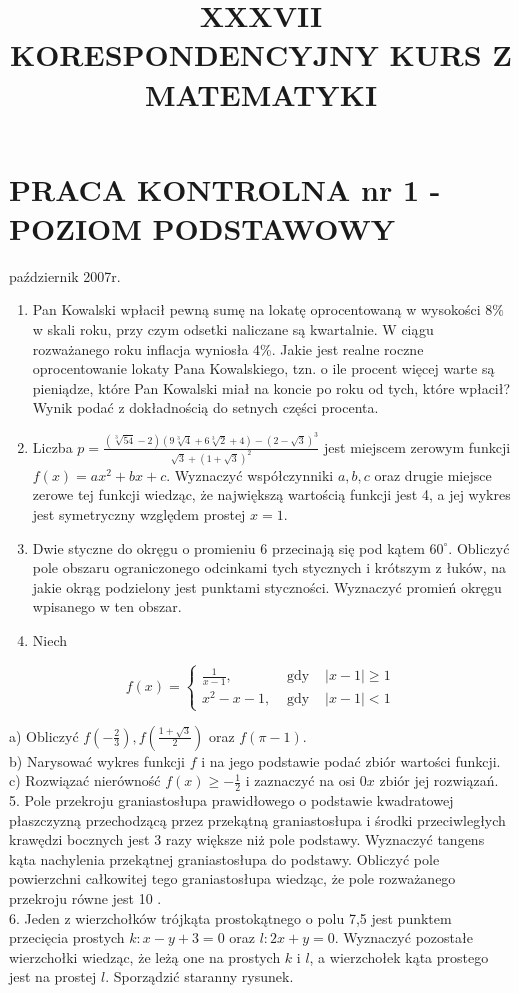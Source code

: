 \documentclass[10pt]{article}
\title{XXXVII \\
 KORESPONDENCYJNY KURS Z MATEMATYKI }
\author{}
\date{}
\begin{document}
\maketitle
\section*{PRACA KONTROLNA nr 1 - POZIOM PODSTAWOWY}
październik 2007r.

\begin{enumerate}
  \item Pan Kowalski wpłacił pewną sumę na lokatę oprocentowaną w wysokości $8 \%$ w skali roku, przy czym odsetki naliczane są kwartalnie. W ciągu rozważanego roku inflacja wyniosła 4\%. Jakie jest realne roczne oprocentowanie lokaty Pana Kowalskiego, tzn. o ile procent więcej warte są pieniądze, które Pan Kowalski miał na koncie po roku od tych, które wpłacił? Wynik podać z dokładnością do setnych części procenta.
  \item Liczba $p=\frac{(\sqrt[3]{54}-2)(9 \sqrt[3]{4}+6 \sqrt[3]{2}+4)-(2-\sqrt{3})^{3}}{\sqrt{3}+(1+\sqrt{3})^{2}}$ jest miejscem zerowym funkcji $f(x)=a x^{2}+b x+c$. Wyznaczyć współczynniki $a, b, c$ oraz drugie miejsce zerowe tej funkcji wiedząc, że największą wartością funkcji jest 4, a jej wykres jest symetryczny względem prostej $x=1$.
  \item Dwie styczne do okręgu o promieniu 6 przecinają się pod kątem $60^{\circ}$. Obliczyć pole obszaru ograniczonego odcinkami tych stycznych i krótszym z łuków, na jakie okrąg podzielony jest punktami styczności. Wyznaczyć promień okręgu wpisanego w ten obszar.
  \item Niech
\end{enumerate}

$$
f(x)=\left\{\begin{array}{lll}
\frac{1}{x-1}, & \text { gdy } & |x-1| \geqslant 1 \\
x^{2}-x-1, & \text { gdy } & |x-1|<1
\end{array}\right.
$$

a) Obliczyć $f\left(-\frac{2}{3}\right), f\left(\frac{1+\sqrt{3}}{2}\right)$ oraz $f(\pi-1)$.\\
b) Narysować wykres funkcji $f$ i na jego podstawie podać zbiór wartości funkcji.\\
c) Rozwiązać nierówność $f(x) \geqslant-\frac{1}{2}$ i zaznaczyć na osi $0 x$ zbiór jej rozwiązań.\\
5. Pole przekroju graniastosłupa prawidłowego o podstawie kwadratowej płaszczyzną przechodzącą przez przekątną graniastosłupa i środki przeciwległych krawędzi bocznych jest 3 razy większe niż pole podstawy. Wyznaczyć tangens kąta nachylenia przekątnej graniastosłupa do podstawy. Obliczyć pole powierzchni całkowitej tego graniastosłupa wiedząc, że pole rozważanego przekroju równe jest 10 .\\
6. Jeden z wierzchołków trójkąta prostokątnego o polu 7,5 jest punktem przecięcia prostych $k: x-y+3=0$ oraz $l: 2 x+y=0$. Wyznaczyć pozostałe wierzchołki wiedząc, że leżą one na prostych $k$ i $l$, a wierzchołek kąta prostego jest na prostej $l$. Sporządzić staranny rysunek.
\end{document}
